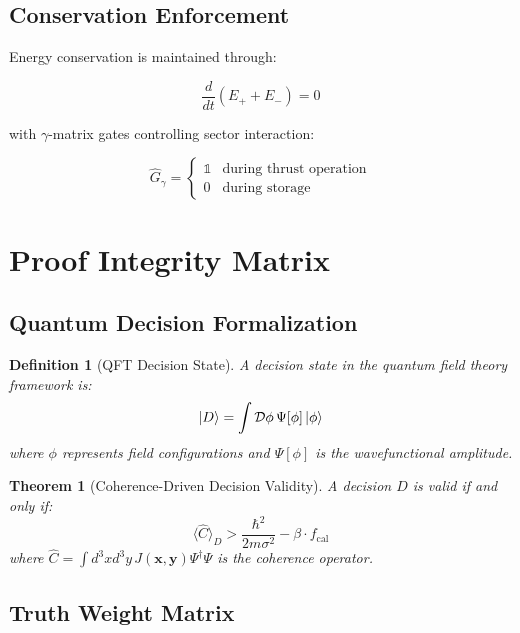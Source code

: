 \documentclass{article}
\newtheorem{definition}{Definition}
\newtheorem{theorem}{Theorem}
\begin{document}
\subsection{Conservation Enforcement}

Energy conservation is maintained through:

\begin{equation}
\frac{d}{dt}(E_+ + E_-) = 0
\end{equation}

with $\gamma$-matrix gates controlling sector interaction:

\begin{equation}
\hat{G}_\gamma = \begin{cases}
\mathbb{1} & \text{during thrust operation} \\
0 & \text{during storage}
\end{cases}
\end{equation}

\section{Proof Integrity Matrix}

\subsection{Quantum Decision Formalization}

\begin{definition}[QFT Decision State]
A decision state in the quantum field theory framework is:
\begin{equation}
\ket{D} = \int \mathcal{D}\phi \, \Psi[\phi] \ket{\phi}
\end{equation}
where $\phi$ represents field configurations and $\Psi[\phi]$ is the wavefunctional amplitude.
\end{definition}

\begin{theorem}[Coherence-Driven Decision Validity]
A decision $D$ is valid if and only if:
\begin{equation}
\langle \hat{C} \rangle_D > \frac{\hbar^2}{2m\sigma^2} - \beta \cdot f_{\text{cal}}
\end{equation}
where $\hat{C} = \int d^3x d^3y \, J(\mathbf{x},\mathbf{y})\Psi^\dagger\Psi$ is the coherence operator.
\end{theorem}

\subsection{Truth Weight Matrix}
\end{document}
